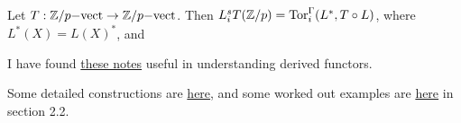     \begin{lemma}
        Let $T:{\mathbb{Z}}/p{\mathrm{-vect}} \to {\mathbb{Z}}/p{\mathrm{-vect}}$.
        Then $L_i^sT({\mathbb{Z}}/p) = \operatorname{Tor}_i^\Gamma(L^\ast,T\circ L)$,
        where $L^\ast(X) = L(X)^\ast$, and
    \end{lemma}
    
    I have found 
    \href{http://www-irma.u-strasbg.fr/~vespa/Cesaro.pdf}{these notes}
    useful in understanding derived functors.
    
    Some detailed constructions are 
    \href{http://www.math.ku.dk/english/research/top/paststudents/gabe.msproject.2010.pdf}
    {here},
    and some worked out examples are
    \href{http://arxiv.org/pdf/0910.2817.pdf}{here} in section 2.2.




 
 